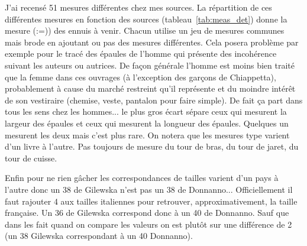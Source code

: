 \documentclass[10pt,a4paper,twoside]{report}
\begin{document}
J'ai recensé 51 mesures différentes chez mes sources. La répartition de ces différentes mesures en fonction des sources (tableau~\ref{tab:meas_det}) donne la mesure (:=)) des ennuis à venir. Chacun utilise un jeu de mesures communes mais brode en ajoutant ou pas des mesures différentes. Cela posera problème par exemple pour le tracé des épaules de l'homme qui présente des incohérence suivant les auteurs ou autrices. De façon générale l'homme est moins bien traité que la femme dans ces ouvrages (à l'exception des garçons de Chiappetta), probablement à cause du marché restreint qu'il représente et du moindre intérêt de son vestiraire (chemise, veste, pantalon pour faire simple). De fait ça part dans tous les sens chez les hommes... le plus gros écart sépare ceux qui mesurent la largeur des épaules et ceux qui mesurent la longueur des épaules. Quelques un mesurent les deux mais c'est plus rare. On notera que les mesures type varient d'un livre à l'autre. Pas toujours de mesure du tour de bras, du tour de jaret, du tour de cuisse.

Enfin pour ne rien gâcher les correspondances de tailles varient d'un pays à l'autre donc un 38 de Gilewska n'est pas un 38 de Donnanno... Officiellement il faut rajouter 4 aux tailles italiennes pour retrouver, approximativement, la taille française. Un 36 de Gilewska correspond donc à un 40 de Donnanno. Sauf que dans les fait quand on compare les valeurs on est plutôt sur une différence de 2 (un 38 Gilewska correspondant à un 40 Donnanno).
\end{document}
